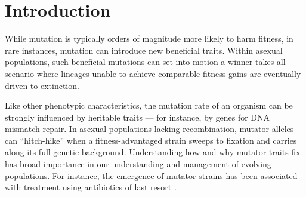 

\section{Introduction} \label{sec:introduction}

While mutation is typically orders of magnitude more likely to harm fitness,
in rare instances, mutation can introduce new beneficial traits.
Within asexual populations, such beneficial mutations can set into motion a winner-takes-all scenario where lineages unable to achieve comparable fitness gains are eventually driven to extinction.

Like other phenotypic characteristics, the mutation rate of an organism can be strongly influenced by heritable traits --- for instance, by genes for DNA mismatch repair. %
In asexual populations lacking recombination, mutator alleles can  ``hitch-hike'' when a fitness-advantaged strain sweeps to fixation and carries along its full genetic background.
Understanding how and why mutator traits fix has broad importance in our understanding and management of evolving populations.
For instance, the emergence of mutator strains has been associated with treatment using antibiotics of last resort \citep{mehta2019essential}.

